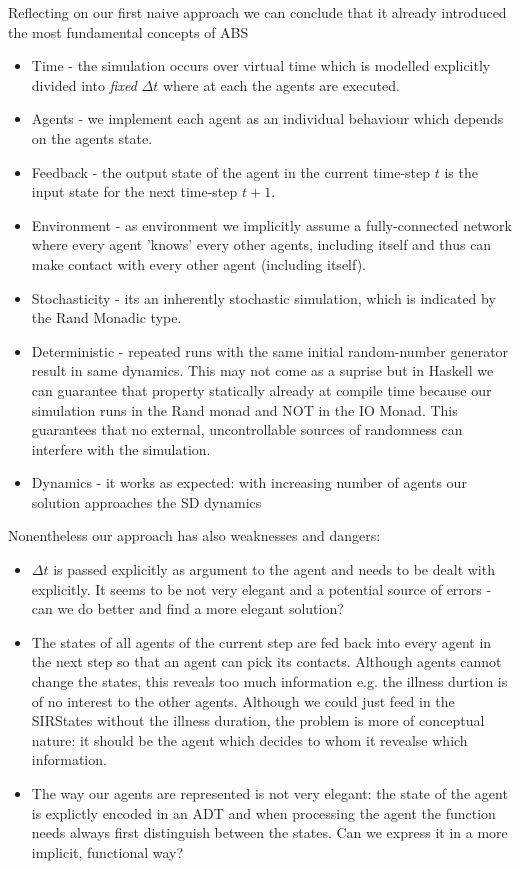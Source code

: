 Reflecting on our first naive approach we can conclude that it already introduced the most fundamental concepts of ABS
\begin{itemize}
	\item Time - the simulation occurs over virtual time which is modelled explicitly divided into \textit{fixed} $\Delta t$ where at each the agents are executed.
	\item Agents - we implement each agent as an individual behaviour which depends on the agents state.
	\item Feedback - the output state of the agent in the current time-step $t$ is the input state for the next time-step $t+1$.
	\item Environment - as environment we implicitly assume a fully-connected network where every agent 'knows' every other agents, including itself and thus can make contact with every other agent (including itself).
	\item Stochasticity - its an inherently stochastic simulation, which is indicated by the Rand Monadic type.
	\item Deterministic - repeated runs with the same initial random-number generator result in same dynamics. This may not come as a suprise but in Haskell we can guarantee that property statically already at compile time because our simulation runs in the Rand monad and NOT in the IO Monad. This guarantees that no external, uncontrollable sources of randomness can interfere with the simulation.
	\item Dynamics - it works as expected: with increasing number of agents our solution approaches the SD dynamics 
\end{itemize}

Nonentheless our approach has also weaknesses and dangers:
\begin{itemize}
	\item $\Delta t$ is passed explicitly as argument to the agent and needs to be dealt with explicitly. It seems to be not very elegant and a potential source of errors - can we do better and find a more elegant solution?
	\item The states of all agents of the current step are fed back into every agent in the next step so that an agent can pick its contacts. Although agents cannot change the states, this reveals too much information e.g. the illness durtion is of no interest to the other agents. Although we could just feed in the SIRStates without the illness duration, the problem is more of conceptual nature: it should be the agent which decides to whom it revealse which information.
	\item The way our agents are represented is not very elegant: the state of the agent is explictly encoded in an ADT and when processing the agent the function needs always first distinguish between the states. Can we express it in a more implicit, functional way?
\end{itemize}